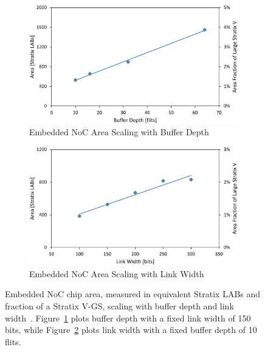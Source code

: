%
\begin{figure}
\centering
%
        \begin{subfigure}[t]{0.4\textwidth}
        		\includegraphics[width=\textwidth]{figs/buffer-depth.pdf}
        		\caption{Embedded NoC Area Scaling with Buffer Depth}
        		\label{buffer-depth}
		\end{subfigure}
        \begin{subfigure}[t]{0.4\textwidth}
        		\includegraphics[width=\textwidth]{figs/link-width.pdf}
        		\caption{Embedded NoC Area Scaling with Link Width}
        		\label{link-width}
		\end{subfigure}
\caption{Embedded NoC chip area, measured in equivalent Stratix LABs and fraction of a Stratix V-GS, scaling with buffer depth and link width~\cite{noc-designer}. Figure~\ref{buffer-depth} plots buffer depth with a fixed link width of 150 bits, while Figure~\ref{link-width} plots link width with a fixed buffer depth of 10 flits.}
\label{noc-area}
\end{figure}
%


